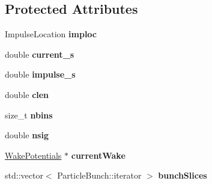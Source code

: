\subsection*{Protected Attributes}
\begin{DoxyCompactItemize}
\item 
\mbox{\label{classParticleTracking_1_1WakeFieldProcess_a254a06a8f79730bfe0a9f9403de235b6}} 
Impulse\+Location {\bfseries imploc}
\item 
\mbox{\label{classParticleTracking_1_1WakeFieldProcess_a41df717d9b39be2064b7babd88e5c60f}} 
double {\bfseries current\+\_\+s}
\item 
\mbox{\label{classParticleTracking_1_1WakeFieldProcess_ad3af4b5cc9fb90f2ecb897bd9f91ae48}} 
double {\bfseries impulse\+\_\+s}
\item 
\mbox{\label{classParticleTracking_1_1WakeFieldProcess_a079b212811832f409dff67033bca71d2}} 
double {\bfseries clen}
\item 
\mbox{\label{classParticleTracking_1_1WakeFieldProcess_acd93b6cb4e95f1a5360577067601e674}} 
size\+\_\+t {\bfseries nbins}
\item 
\mbox{\label{classParticleTracking_1_1WakeFieldProcess_ae180c9720458d76f34d6581c7893e286}} 
double {\bfseries nsig}
\item 
\mbox{\label{classParticleTracking_1_1WakeFieldProcess_a161cca742606b99b9bcf1b4e189610fa}} 
\hyperlink{classWakePotentials}{Wake\+Potentials} $\ast$ {\bfseries current\+Wake}
\item 
\mbox{\label{classParticleTracking_1_1WakeFieldProcess_af4d707e3b7b6e1d861854a8f981028c7}} 
std\+::vector$<$ Particle\+Bunch\+::iterator $>$ {\bfseries bunch\+Slices}
\item 
\mbox{\label{classParticleTracking_1_1WakeFieldProcess_af1d82c90b5c5b14585bf703096f6055d}} 

\end{DoxyCompactItemize}
